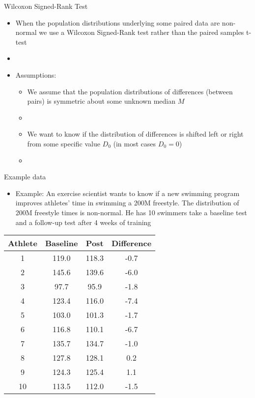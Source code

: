 \documentclass[xcolor=dvipsnames]{beamer}
\begin{document}
\begin{frame}{Wilcoxon Signed-Rank Test}
	\begin{itemize}
		\item When the population distributions underlying some paired data are non-normal we use a Wilcoxon Signed-Rank test rather than the paired samples t-test
		\item[]
		\item Assumptions: 
		\begin{itemize}
			\item We assume that the population distributions of differences (between pairs) is symmetric about some unknown median $M$
			\item[]
			\item We want to know if the distribution of differences is shifted left or right from some specific value $D_0$ (in most cases $D_0 = 0$)
			\item[]
		\end{itemize}
	\end{itemize}
\end{frame}

\begin{frame}{Example data}
\begin{itemize}
			\item Example: An exercise scientist wants to know if a new swimming program improves athletes' time in swimming a 200M freestyle. The distribution of 200M freestyle times is non-normal. He has 10 swimmers take a baseline test and a follow-up test after 4 weeks of training
\end{itemize}
	\begin{center}
		\begin{tabular}{|c|c|c|c|}
			\hline
			  \textbf{Athlete} &  \textbf{Baseline} &      \textbf{Post}    & \textbf{Difference} \\ \hline 
			  \hline
1  &     119.0 &  118.3 &  -0.7\\ \hline
2   &    145.6 &  139.6 &  -6.0\\ \hline
3    &    97.7 &   95.9 &  -1.8\\ \hline
4    &   123.4 &  116.0 &  -7.4\\ \hline
5    &   103.0 &  101.3 &  -1.7\\ \hline
6    &   116.8 &  110.1 &  -6.7\\ \hline
7     &  135.7 &  134.7 &  -1.0\\ \hline
8     &  127.8 &  128.1 &   0.2\\ \hline
9     &  124.3 &  125.4 &   1.1\\ \hline
10    &  113.5 &  112.0 &  -1.5\\ \hline
		\end{tabular}
	\end{center}
\end{frame}
\end{document}
